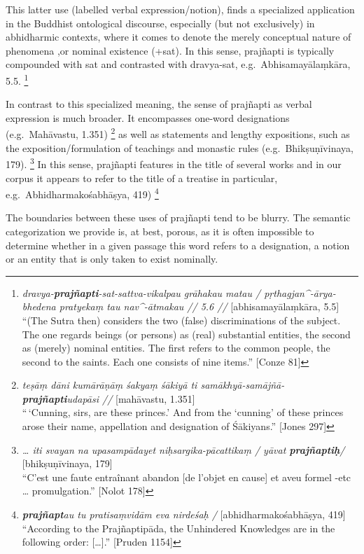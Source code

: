 \documentclass[
  letterpaper,
  DIV=11,
  numbers=noendperiod,
  oneside]{scrreprt}
\begin{document}
This latter use (labelled verbal expression/notion), finds a specialized
application in the Buddhist ontological discourse, especially (but not
exclusively) in abhidharmic contexts, where it comes to denote the
merely conceptual nature of phenomena ,or nominal existence (+sat). In
this sense, prajñapti is typically compounded with sat and contrasted
with dravya-sat, e.g.~Abhisamayālaṃkāra, 5.5. \footnote{\emph{dravya-\textbf{prajñapti}-sat-sattva-vikalpau
  grāhakau matau / pṛthagjan\^{}-ārya-bhedena pratyekaṃ tau
  nav\^{}-ātmakau // 5.6 //} {[}abhisamayālaṃkāra, 5.5{]}\\
  ``(The Sutra then) considers the two (false) discriminations of the
  subject. The one regards beings (or persons) as (real) substantial
  entities, the second as (merely) nominal entities. The first refers to
  the common people, the second to the saints. Each one consists of nine
  items.'' {[}Conze 81{]}}

In contrast to this specialized meaning, the sense of prajñapti as
verbal expression is much broader. It encompasses one-word designations
(e.g.~Mahāvastu, 1.351) \footnote{\emph{teṣāṃ dāni kumārāṇāṃ śakyaṃ
  śākiyā ti samākhyā-samājñā-\textbf{prajñapti}udapāsi //} {[}mahāvastu,
  1.351{]}\\
  ``\,`Cunning, sirs, are these princes.' And from the `cunning' of
  these princes arose their name, appellation and designation of
  Śākiyans.'' {[}Jones 297{]}} as well as statements and lengthy
expositions, such as the exposition/formulation of teachings and
monastic rules (e.g.~Bhikṣuṇīvinaya, 179). \footnote{\emph{\ldots{} iti
  svayan na upasampādayet niḥsargika-pācattikaṃ / yāvat
  \textbf{prajñaptiḥ}/} {[}bhikṣuṇīvinaya, 179{]}\\
  ``C'est une faute entraînant abandon {[}de l'objet en cause{]} et aveu
  formel -etc \ldots{} promulgation.'' {[}Nolot 178{]}} In this sense,
prajñapti features in the title of several works and in our corpus it
appears to refer to the title of a treatise in particular,
e.g.~Abhidharmakośabhāṣya, 419) \footnote{\emph{\textbf{prajñapt}au tu
  pratisaṃvidām eva nirdeśaḥ /} {[}abhidharmakośabhāṣya, 419{]}\\
  ``According to the Prajñaptipāda, the Unhindered Knowledges are in the
  following order: {[}\ldots{]}.'' {[}Pruden 1154{]}}

The boundaries between these uses of prajñapti tend to be blurry. The
semantic categorization we provide is, at best, porous, as it is often
impossible to determine whether in a given passage this word refers to a
designation, a notion or an entity that is only taken to exist
nominally.
\end{document}
